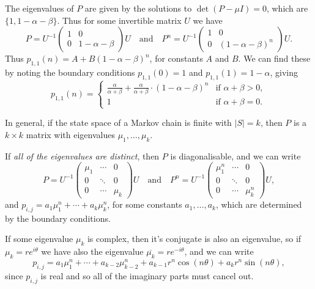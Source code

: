 \documentclass[a4paper]{scrartcl}
\begin{document}
\begin{example}
	The eigenvalues of $P$ are given by the solutions to $\det(P - \mu I) = 0$, which are $\{1, 1 - \alpha - \beta\}$. Thus for some invertible matrix $U$ we have
	$$
	P = U^{-1}\begin{pmatrix}
		1 & 0 \\ 0 & 1 - \alpha - \beta
	\end{pmatrix}U \quad \text{and} \quad P^n = U^{-1} \begin{pmatrix}
		1 & 0 \\ 0 & (1 - \alpha - \beta)^n
	\end{pmatrix}U.
	$$
	Thus $p_{1, 1}(n) = A + B(1 - \alpha - \beta)^n$, for constants $A$ and $B$. We can find these by noting the boundary conditions $p_{1, 1}(0) = 1$ and $p_{1, 1}(1) = 1 - \alpha$, giving 
	$$
		p_{1, 1}(n) = \begin{cases}
			\frac{\alpha}{\alpha+\beta}+\frac{\alpha}{\alpha+\beta} \cdot(1-\alpha-\beta)^{n} &\mbox{if } \alpha + \beta > 0, \\
			1 &\mbox{if } \alpha + \beta = 0.
		   \end{cases}
	$$
\end{example}

In general, if the state space of a Markov chain is finite with $|S| = k$, then $P$ is a $k \times k$ matrix with eigenvalues $\mu_1, \dots, \mu_k$.

If \emph{all of the eigenvalues are distinct}, then $P$ is diagonalisable, and we can write
$$
P = U^{-1} \begin{pmatrix}
	\mu_1 & \cdots & 0 \\
	0 & \ddots & 0 \\
	0 & \cdots & \mu_k
\end{pmatrix} U \quad \text{and} \quad P^n = U^{-1} \begin{pmatrix}
	\mu_1^n & \cdots & 0 \\
	0 & \ddots & 0 \\
	0 & \cdots & \mu_k^n
\end{pmatrix} U,
$$
and $p_{i,j} = a_1 \mu_1^n + \cdots + a_k \mu_k^n$, for some constants $a_1, \dots, a_k$, which are determined by the boundary conditions.

If some eigenvalue $\mu_k$ is complex, then it's conjugate is also an eigenvalue, so if $\mu_k = re^{i \theta}$ we have also the eigenvalue $\overline{\mu_k} = re^{-i \theta}$, and we can write
$$
p_{i, j} = a_1 \mu_1^n + \cdots + a_{k - 2}\mu_{k - 2}^n + a_{k - 1}r^n \cos(n \theta) + a_k r^n \sin (n \theta),
$$
since $p_{i, j}$ is real and so all of the imaginary parts must cancel out.
\end{document}
